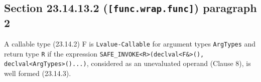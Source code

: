 \documentclass{article}
\begin{document}
\subsection{Section 23.14.13.2 (\texttt{[func.wrap.func]}) paragraph 2}
A callable type (23.14.2) F is \texttt{Lvalue-Callable} for argument types
\texttt{ArgTypes} and return type \texttt{R} if the expression
\texttt{SAFE\_INVOKE<R>(declval<F&>(), declval<ArgTypes>()...)}, considered as
an unevaluated operand (Clause 8), is well formed (23.14.3).
\end{document}
